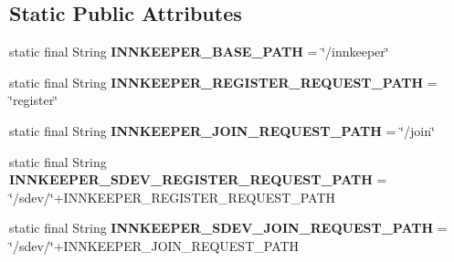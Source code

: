 \subsection*{Static Public Attributes}
\begin{DoxyCompactItemize}
\item 
\mbox{\label{classeu_1_1h2020_1_1symbiote_1_1ssp_1_1constants_1_1InnkeeperRestControllerConstants_ac7494993f81f4decd25d96b30d8b8169}} 
static final String {\bfseries I\+N\+N\+K\+E\+E\+P\+E\+R\+\_\+\+B\+A\+S\+E\+\_\+\+P\+A\+TH} = \char`\"{}/innkeeper\char`\"{}
\item 
\mbox{\label{classeu_1_1h2020_1_1symbiote_1_1ssp_1_1constants_1_1InnkeeperRestControllerConstants_a4b38d63ba26ac17c14fc658171821f91}} 
static final String {\bfseries I\+N\+N\+K\+E\+E\+P\+E\+R\+\_\+\+R\+E\+G\+I\+S\+T\+E\+R\+\_\+\+R\+E\+Q\+U\+E\+S\+T\+\_\+\+P\+A\+TH} = \char`\"{}register\char`\"{}
\item 
\mbox{\label{classeu_1_1h2020_1_1symbiote_1_1ssp_1_1constants_1_1InnkeeperRestControllerConstants_a2ee623ddb1f714682c35c67ed407ad77}} 
static final String {\bfseries I\+N\+N\+K\+E\+E\+P\+E\+R\+\_\+\+J\+O\+I\+N\+\_\+\+R\+E\+Q\+U\+E\+S\+T\+\_\+\+P\+A\+TH} = \char`\"{}/join\char`\"{}
\item 
\mbox{\label{classeu_1_1h2020_1_1symbiote_1_1ssp_1_1constants_1_1InnkeeperRestControllerConstants_afdc3b3f04cf8a8f83057de1715f28775}} 
static final String {\bfseries I\+N\+N\+K\+E\+E\+P\+E\+R\+\_\+\+S\+D\+E\+V\+\_\+\+R\+E\+G\+I\+S\+T\+E\+R\+\_\+\+R\+E\+Q\+U\+E\+S\+T\+\_\+\+P\+A\+TH} = \char`\"{}/sdev/\char`\"{}+I\+N\+N\+K\+E\+E\+P\+E\+R\+\_\+\+R\+E\+G\+I\+S\+T\+E\+R\+\_\+\+R\+E\+Q\+U\+E\+S\+T\+\_\+\+P\+A\+TH
\item 
\mbox{\label{classeu_1_1h2020_1_1symbiote_1_1ssp_1_1constants_1_1InnkeeperRestControllerConstants_af7894152f64edc6aa714435be8273eac}} 
static final String {\bfseries I\+N\+N\+K\+E\+E\+P\+E\+R\+\_\+\+S\+D\+E\+V\+\_\+\+J\+O\+I\+N\+\_\+\+R\+E\+Q\+U\+E\+S\+T\+\_\+\+P\+A\+TH} = \char`\"{}/sdev/\char`\"{}+I\+N\+N\+K\+E\+E\+P\+E\+R\+\_\+\+J\+O\+I\+N\+\_\+\+R\+E\+Q\+U\+E\+S\+T\+\_\+\+P\+A\+TH

\end{DoxyCompactItemize}
